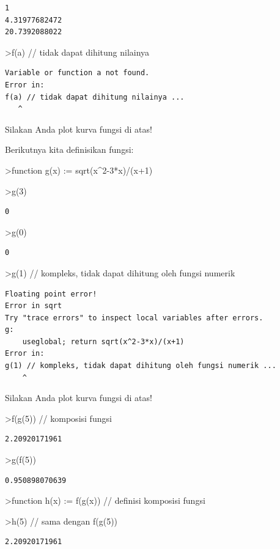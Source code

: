 \documentclass[
]{book}
\begin{document}
\begin{verbatim}
1
4.31977682472
20.7392088022
\end{verbatim}

\textgreater f(a) // tidak dapat dihitung nilainya

\begin{verbatim}
Variable or function a not found.
Error in:
f(a) // tidak dapat dihitung nilainya ...
   ^
\end{verbatim}

Silakan Anda plot kurva fungsi di atas!

Berikutnya kita definisikan fungsi:

\textgreater function g(x) := sqrt(x\^{}2-3*x)/(x+1)

\textgreater g(3)

\begin{verbatim}
0
\end{verbatim}

\textgreater g(0)

\begin{verbatim}
0
\end{verbatim}

\textgreater g(1) // kompleks, tidak dapat dihitung oleh fungsi numerik

\begin{verbatim}
Floating point error!
Error in sqrt
Try "trace errors" to inspect local variables after errors.
g:
    useglobal; return sqrt(x^2-3*x)/(x+1) 
Error in:
g(1) // kompleks, tidak dapat dihitung oleh fungsi numerik ...
    ^
\end{verbatim}

Silakan Anda plot kurva fungsi di atas!

\textgreater f(g(5)) // komposisi fungsi

\begin{verbatim}
2.20920171961
\end{verbatim}

\textgreater g(f(5))

\begin{verbatim}
0.950898070639
\end{verbatim}

\textgreater function h(x) := f(g(x)) // definisi komposisi fungsi

\textgreater h(5) // sama dengan f(g(5))

\begin{verbatim}
2.20920171961
\end{verbatim}
\end{document}
